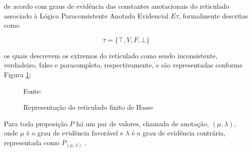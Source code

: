 de acordo com graus de evidência das constantes anotacionais do reticulado 
associado à Lógica Paraconsistente Anotada Evidencial $E\tau$, 
formalmente descritas como 

\begin{center}
\begin{equation}
  \tau = \{ \top , V, F, \bot \}
\end{equation}
\end{center}

os quais descrevem os extremos do reticulado como sendo 
inconsistente,%
verdadeiro, %
falso e %
paracompleto,%
respectivamente, e são representadas conforme Figura \ref{fig:reticuladoHasse}; 






\begin{figure}[!h]
\centering
\caption{Representação do reticulado finito de Hasse }
\label{fig:reticuladoHasse}

{\small Fonte: \cite{JoaoInacio}}
\end{figure}








Para toda proposição $P$ há um par de valores, chamada de anotação, $(\mu , \lambda )$, onde $\mu$ é o grau de evidência favorável e $\lambda $ é o grau de evidência contrária, representada como  $P_{( \mu , \lambda )}$ \cite{Abe2014} .

